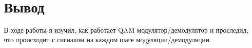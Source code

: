 \chapter{Вывод}
\label{ch:сhap5}

В ходе работы я изучил, как работает QAM модулятор/демодулятор и проследил, что происходит с сигналом на каждом шаге модуляции/демодуляции.
\endinput